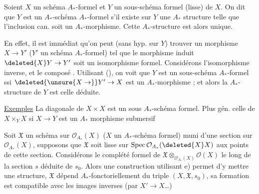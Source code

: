 Soient $X$ un schéma $A_*$-formel et $Y$ un sous-schéma formel (lisse) de $X$.  On dit que $Y$ est un  $A_*$-schéma $A_*$-formel s'il existe sur $Y$ une $A_*$ structure telle que l'inclusion can. soit un $A_*$-morphisme. Cette $A_*$-structure est alors unique.

En effet, il est immédiat qu'on peut (sans hyp. sur $Y$) trouver un  morphisme $X\to Y'$ ($Y'$ un schéma $A_*$-formel) tel que le morphisme induit $\deleted{X}Y\to Y'$ soit un isomorphisme formel.  Considérons l'isomorphisme inverse, et le composé
.
Utilisant (), on voit que  $Y$ est un sous-schéma $A_*$-formel ssi $\deleted{\unsure{X\to}}Y'\to X$ est un $A_*$-morphisme ; et alors la $A_*$-structure de $Y$ est celle déduite.

\uline{Exemples} La diagonale de $X\times X$ est un sous $A_*$-schéma formel. Plus gén. celle de $X\times_Y X$ si $X\to Y$ est un $A_*$ morphisme submersif 


Soit $\mathfrak X$ un schéma sur $\mathcal O_{A_*}(X)$ ($X$ un $A_*$-schéma formel) muni d'une section  sur $\mathcal O_{A_*}(X)$, supposons que $\mathfrak X$ soit lisse sur $\mathrm{Spec}\,\mathcal O_{A_*}(\deleted{X}X)$ aux points de cette section. Considérons le complété formel  de $\mathfrak X\otimes_{\mathcal O_{A_*}(X)}\mathcal O(X)$ le long de la section $s$ déduite de $s_0$. Alors une construction utilisant e) permet d'y mettre une structure,   $\mathfrak X$  dépend $A_*$-fonctoriellement du triple $(X,\mathfrak X,s_0)$, sa formation est compatible avec les images inverses (par $X'\to X$\ldots)
